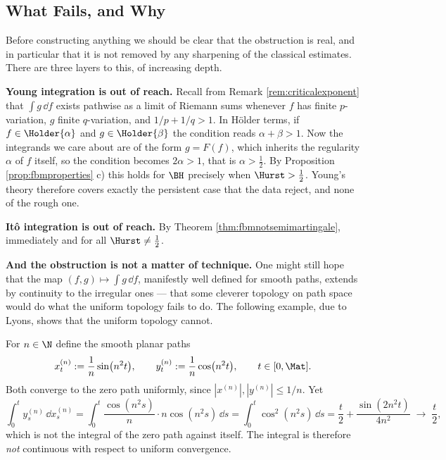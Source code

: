 \subsection{What Fails, and Why}\label{subsec:whatfails}

Before constructing anything we should be clear that the obstruction is real, and in particular
that it is not removed by any sharpening of the classical estimates. There are three layers to
this, of increasing depth.

\medskip

\noindent\textbf{Young integration is out of reach.} Recall from Remark \ref{rem:criticalexponent}
that $\int g\,\dd f$ exists pathwise as a limit of Riemann sums whenever $f$ has finite
$p$-variation, $g$ finite $q$-variation, and $1/p + 1/q > 1$. In Hölder terms, if
$f \in \Holder{\alpha}$ and $g \in \Holder{\beta}$ the condition reads $\alpha + \beta > 1$. Now the
integrands we care about are of the form $g = F(f)$, which inherits the regularity $\alpha$ of $f$
itself, so the condition becomes $2\alpha > 1$, that is $\alpha > \tfrac12$. By Proposition
\ref{prop:fbmproperties} c) this holds for $\BH$ precisely when $\Hurst > \tfrac12$. Young's theory
therefore covers exactly the persistent case that the data reject, and none of the rough one.

\medskip

\noindent\textbf{Itô integration is out of reach.} By Theorem \ref{thm:fbmnotsemimartingale},
immediately and for all $\Hurst \neq \tfrac12$.

\medskip

\noindent\textbf{And the obstruction is not a matter of technique.} One might still hope that the
map $(f,g)\mapsto \int g\,\dd f$, manifestly well defined for smooth paths, extends by continuity
to the irregular ones --- that some cleverer topology on path space would do what the uniform
topology fails to do. The following example, due to Lyons, shows that the uniform topology cannot.

\begin{example}\label{ex:lyonscounterexample}
For $n \in \N$ define the smooth planar paths
\begin{equation}\label{eq:lyonsexample}
x^{(n)}_t := \frac{1}{n}\sin\bigl(n^2 t\bigr), \qquad
y^{(n)}_t := \frac{1}{n}\cos\bigl(n^2 t\bigr), \qquad t \in [0,\Mat].
\end{equation}
Both converge to the zero path uniformly, since $|x^{(n)}|,|y^{(n)}| \leq 1/n$. Yet
\[
\int_0^t y^{(n)}_s\,\dd x^{(n)}_s = \int_0^t \frac{\cos(n^2s)}{n}\cdot n\cos(n^2 s)\,\dd s
= \int_0^t \cos^2(n^2 s)\,\dd s = \frac{t}{2} + \frac{\sin(2n^2t)}{4n^2} \;\longrightarrow\; \frac{t}{2},
\]
which is not the integral of the zero path against itself. The integral is therefore \emph{not}
continuous with respect to uniform convergence.
\end{example}

